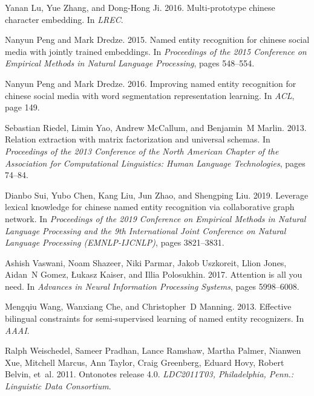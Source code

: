 \documentclass[11pt,a4paper]{article}
\begin{document}
\begin{CJK}{UTF8}{gbsn}
\begin{thebibliography}{35}
Yanan Lu, Yue Zhang, and Dong-Hong Ji. 2016.
\newblock Multi-prototype chinese character embedding.
\newblock In \emph{LREC}.

Nanyun Peng and Mark Dredze. 2015.
\newblock Named entity recognition for chinese social media with jointly
  trained embeddings.
\newblock In \emph{Proceedings of the 2015 Conference on Empirical Methods in
  Natural Language Processing}, pages 548--554.

Nanyun Peng and Mark Dredze. 2016.
\newblock Improving named entity recognition for chinese social media with word
  segmentation representation learning.
\newblock In \emph{ACL}, page 149.

Sebastian Riedel, Limin Yao, Andrew McCallum, and Benjamin~M Marlin. 2013.
\newblock Relation extraction with matrix factorization and universal schemas.
\newblock In \emph{Proceedings of the 2013 Conference of the North American
  Chapter of the Association for Computational Linguistics: Human Language
  Technologies}, pages 74--84.

Dianbo Sui, Yubo Chen, Kang Liu, Jun Zhao, and Shengping Liu. 2019.
\newblock Leverage lexical knowledge for chinese named entity recognition via
  collaborative graph network.
\newblock In \emph{Proceedings of the 2019 Conference on Empirical Methods in
  Natural Language Processing and the 9th International Joint Conference on
  Natural Language Processing (EMNLP-IJCNLP)}, pages 3821--3831.

Ashish Vaswani, Noam Shazeer, Niki Parmar, Jakob Uszkoreit, Llion Jones,
  Aidan~N Gomez, {\L}ukasz Kaiser, and Illia Polosukhin. 2017.
\newblock Attention is all you need.
\newblock In \emph{Advances in Neural Information Processing Systems}, pages
  5998--6008.

Mengqiu Wang, Wanxiang Che, and Christopher~D Manning. 2013.
\newblock Effective bilingual constraints for semi-supervised learning of named
  entity recognizers.
\newblock In \emph{AAAI}.

Ralph Weischedel, Sameer Pradhan, Lance Ramshaw, Martha Palmer, Nianwen Xue,
  Mitchell Marcus, Ann Taylor, Craig Greenberg, Eduard Hovy, Robert Belvin,
  et~al. 2011.
\newblock Ontonotes release 4.0.
\newblock \emph{LDC2011T03, Philadelphia, Penn.: Linguistic Data Consortium}.


\end{thebibliography}
\end{CJK}
\end{document}
